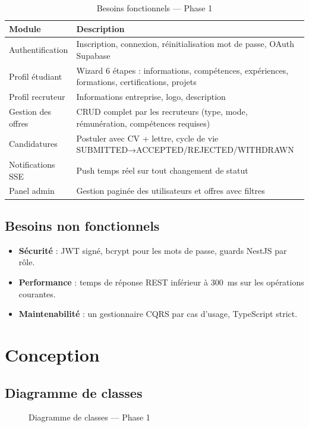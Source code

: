 ﻿\documentclass[12pt,a4paper]{report}
\begin{document}
\begin{table}[H]
\centering
\begin{tabularx}{\textwidth}{lX}
\toprule
\textbf{Module} & \textbf{Description} \\
\midrule
Authentification & Inscription, connexion, réinitialisation mot de passe, OAuth Supabase \\
Profil étudiant & Wizard 6 étapes : informations, compétences, expériences, formations, certifications, projets \\
Profil recruteur & Informations entreprise, logo, description \\
Gestion des offres & CRUD complet par les recruteurs (type, mode, rémunération, compétences requises) \\
Candidatures & Postuler avec CV + lettre, cycle de vie SUBMITTED→ACCEPTED/REJECTED/WITHDRAWN \\
Notifications SSE & Push temps réel sur tout changement de statut \\
Panel admin & Gestion paginée des utilisateurs et offres avec filtres \\
\bottomrule
\end{tabularx}
\caption{Besoins fonctionnels — Phase 1}
\end{table}

\subsection{Besoins non fonctionnels}
\begin{itemize}
  \item \textbf{Sécurité} : JWT signé, bcrypt pour les mots de passe, guards NestJS par rôle.
  \item \textbf{Performance} : temps de réponse REST inférieur à 300~ms sur les opérations courantes.
  \item \textbf{Maintenabilité} : un gestionnaire CQRS par cas d'usage, TypeScript strict.
\end{itemize}

\section{Conception}

\subsection{Diagramme de classes}

\begin{figure}[H]
\centering
\resizebox{\textwidth}{!}{}
\caption{Diagramme de classes — Phase 1}
\label{fig:class_r1}
\end{figure}
\end{document}
